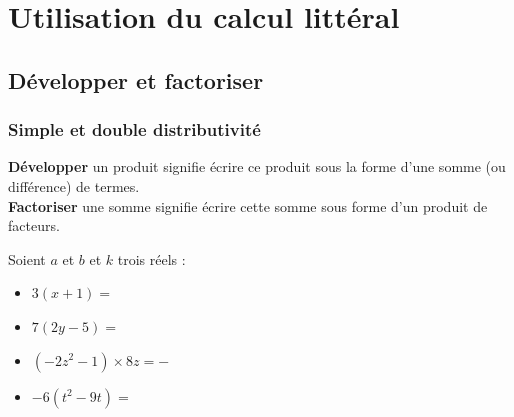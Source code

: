 



\chapter{Utilisation du calcul littéral}





\section{Développer et factoriser}
\subsection{Simple et double distributivité}

\begin{Définition}
{\bf{Développer}} un produit signifie écrire ce produit sous la forme d'une somme (ou différence) de termes. \\
{\bf{Factoriser}} une somme signifie écrire cette somme sous forme d'un produit de facteurs.
\end{Définition}

\vspace{0.5cm}

\begin{Propriété}
Soient $a$ et $b$ et $k$ trois réels : 

\begin{center}
\end{center}

\end{Propriété}

\vspace{0.5cm}

\begin{Exemple}
\leavevmode\vspace{-\baselineskip}
\begin{itemize}[label=\textcolor{Couleur8}{$\bullet$}]
\item $3(x+1)=$ \ligne
\item $7(2y-5)=$ \ligne
\item $(-2z^2-1)\times 8z=-$ \ligne
\item $-6(t^2-9t)=$ \ligne
\end{itemize}
\end{Exemple}

